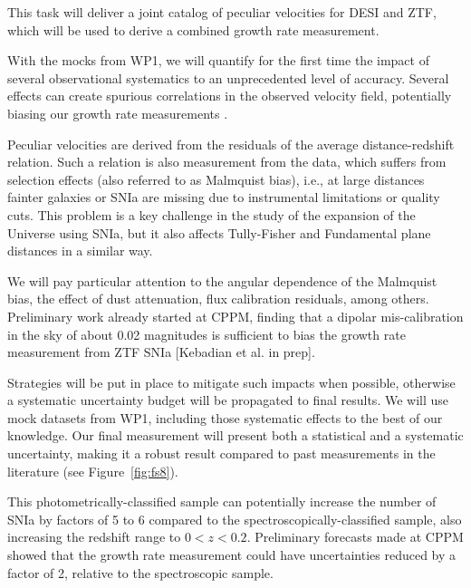     This task will deliver a joint catalog of peculiar velocities for DESI and ZTF, 
    which will be used to derive a combined growth rate measurement. 

    With the mocks from WP1, 
    we will quantify for the first time the impact 
    of several observational systematics to an unprecedented level of accuracy.
    Several effects can create spurious correlations in the observed velocity field, 
    potentially biasing our growth rate measurements \cite{rossCompletedSDSSIVExtended2020}. 

    Peculiar velocities are derived from the residuals of the average distance-redshift
    relation. Such a relation is also measurement from the data, which suffers from 
    selection effects (also referred to as Malmquist bias), i.e., at large distances fainter
    galaxies or SNIa are missing due to instrumental limitations or quality cuts.
    This problem is a key challenge in the study of the expansion of the Universe using 
    SNIa, but it also affects Tully-Fisher and Fundamental plane distances in a similar way.

    We will pay particular attention to 
    the angular dependence of the Malmquist bias, the effect of dust attenuation, 
    flux calibration residuals, among others. Preliminary work already started at CPPM, 
    finding that a dipolar mis-calibration in the sky of about 0.02 magnitudes is sufficient 
    to bias the growth rate measurement from ZTF SNIa [Kebadian et al. in prep]. 
    
    Strategies will be put in place to mitigate such impacts when possible, 
    otherwise a systematic uncertainty budget will be propagated to final results.
    We will use mock datasets from WP1, including those systematic effects to the best 
    of our knowledge. Our final measurement will present both a statistical and a 
    systematic uncertainty, making it a robust result compared to past measurements
    in the literature (see Figure~\ref{fig:fs8}). 
    

    This photometrically-classified sample can potentially increase the 
    number of SNIa by factors of 5 to 6 compared to the spectroscopically-classified sample,
    also increasing the redshift range to $0< z< 0.2$. Preliminary forecasts 
    made at CPPM showed that the growth rate measurement could have uncertainties
    reduced by a factor of 2, relative to the spectroscopic sample. 

